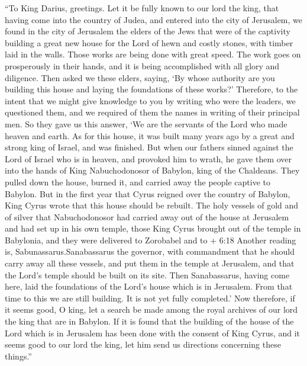 ``To King Darius, greetings. Let it be fully known to our
lord the king, that having come into the country of Judea, and entered
into the city of Jerusalem, we found in the city of Jerusalem the elders
of the Jews that were of the captivity  building a great new
house for the Lord of hewn and costly stones, with timber laid in the
walls.  Those works are being done with great speed. The
work goes on prosperously in their hands, and it is being accomplished
with all glory and diligence.  Then asked we these elders,
saying, `By whose authority are you building this house and laying the
foundations of these works?'  Therefore, to the intent that
we might give knowledge to you by writing who were the leaders, we
questioned them, and we required of them the names in writing of their
principal men.  So they gave us this answer, `We are the
servants of the Lord who made heaven and earth.  As for
this house, it was built many years ago by a great and strong king of
Israel, and was finished.  But when our fathers sinned
against the Lord of Israel who is in heaven, and provoked him to wrath,
he gave them over into the hands of King Nabuchodonosor of Babylon, king
of the Chaldeans.  They pulled down the house, burned it,
and carried away the people captive to Babylon.  But in the
first year that Cyrus reigned over the country of Babylon, King Cyrus
wrote that this house should be rebuilt.  The holy vessels
of gold and of silver that Nabuchodonosor had carried away out of the
house at Jerusalem and had set up in his own temple, those King Cyrus
brought out of the temple in Babylonia, and they were delivered to
Zorobabel and to + 6:18 Another reading is, Sabunassarus.Sanabassarus
the governor,  with commandment that he should carry away
all these vessels, and put them in the temple at Jerusalem, and that the
Lord's temple should be built on its site.  Then
Sanabassarus, having come here, laid the foundations of the Lord's house
which is in Jerusalem. From that time to this we are still building. It
is not yet fully completed.'  Now therefore, if it seems
good, O king, let a search be made among the royal archives of our lord
the king that are in Babylon.  If it is found that the
building of the house of the Lord which is in Jerusalem has been done
with the consent of King Cyrus, and it seems good to our lord the king,
let him send us directions concerning these things.''

